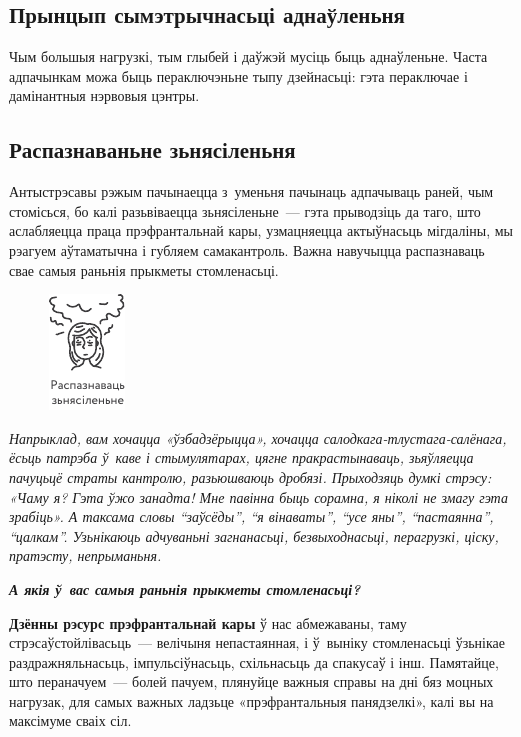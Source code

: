 \subsection*{Прынцып сымэтрычнасьці аднаўленьня}

Чым большыя нагрузкі, тым глыбей і даўжэй мусіць быць аднаўленьне. Часта адпачынкам можа быць пераключэньне тыпу дзейнасьці: гэта пераключае і дамінантныя нэрвовыя цэнтры.

\subsection*{Распазнаваньне зьнясіленьня}

Антыстрэсавы рэжым пачынаецца з~уменьня пачынаць адпачываць раней, чым стомісься, бо калі разьвіваецца зьнясіленьне~--- гэта прыводзіць да таго, што аслабляецца праца прэфрантальнай кары, узмацняецца актыўнасьць мігдаліны, мы рэагуем аўтаматычна і губляем самакантроль. Важна навучыцца распазнаваць свае самыя раньнія прыкметы стомленасьці. 

\begin{figure}[htb!]
  \centering
  \includegraphics[scale=1.5]{willpower/ch7/4.pdf}
\end{figure}

\emph{Напрыклад, вам хочацца «ўзбадзёрыцца», хочацца салодкага-тлустага-салёнага, ёсьць патрэба ў~каве і стымулятарах, цягне пракрастынаваць, зьяўляецца пачуцьцё страты кантролю, разьюшваюць дробязі. Прыходзяць думкі стрэсу: «Чаму я? Гэта ўжо занадта! Мне павінна быць сорамна, я ніколі не змагу гэта зрабіць». А таксама словы ``заўсёды'', ``я вінаваты'', ``усе яны'', ``пастаянна'', ``цалкам''. Узьнікаюць адчуваньні загнанасьці, безвыходнасьці, перагрузкі, ціску, пратэсту, непрыманьня.}

\emph{\textbf{А якія ў~вас самыя раньнія прыкметы стомленасьці?}}

\textbf{Дзённы рэсурс прэфрантальнай кары} ў нас абмежаваны, таму стрэсаўстойлівасьць~--- велічыня непастаянная, і ў~выніку стомленасьці ўзьнікае раздражняльнасьць, імпульсіўнасьць, схільнасьць да спакусаў і інш. Памятайце, што пераначуем~--- болей пачуем, плянуйце важныя справы на дні бяз моцных нагрузак, для самых важных ладзьце «прэфрантальныя панядзелкі», калі вы на максімуме сваіх сіл. 

